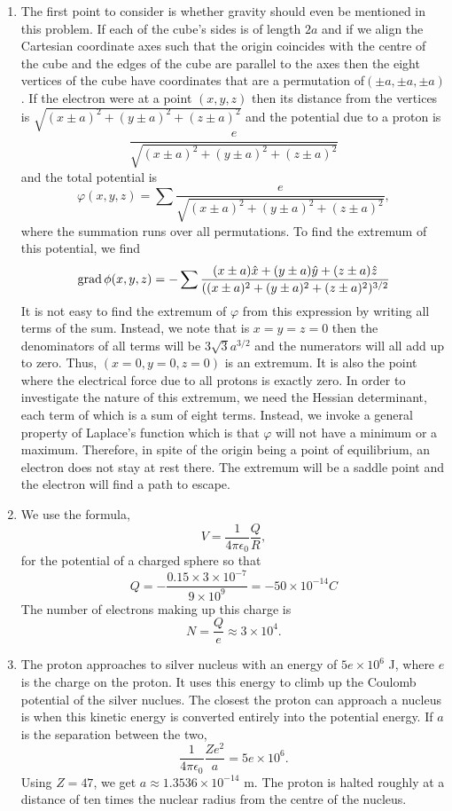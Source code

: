 \documentclass{article}
\begin{document}
\begin{enumerate}
\item The first point to consider is whether gravity should even be mentioned in
this problem. If each of the cube's sides is of length $2a$ and if we align the
Cartesian coordinate axes such that the origin coincides with the centre of the
cube and the edges of the cube are parallel to the axes then the eight vertices
of the cube have coordinates that are a permutation of$(\pm a, \pm a, \pm a)$.
If the electron were at a point $(x, y, z)$ then its distance from the vertices
is $\sqrt{(x \pm a)^2 + (y \pm a)^2 + (z \pm a)^2}$ and the potential due to a
proton is
\[
\frac{e}{\sqrt{(x \pm a)^2 + (y \pm a)^2 + (z \pm a)^2}}
\]
and the total potential is
\[
\varphi(x, y, z) = \sum \frac{e}{\sqrt{(x \pm a)^2 + (y \pm a)^2 + (z \pm a)^2}},
\]
where the summation runs over all permutations. To find the extremum of this
potential, we find
\[
\operatorname{grad}\phi(x,y,z) = -\sum\frac{(x \pm a)\hat{x}+(y \pm a)\hat{y}+(z \pm a)\hat{z}}
{((x \pm a)^2 + (y \pm a)^2 + (z \pm a)^2)^{3/2}}
\]
It is not easy to find the extremum of $\varphi$ from this expression by writing
all terms of the sum. Instead, we note that is $x = y = z = 0$ then the denominators
of all terms will be $3\sqrt{3}a^{3/2}$ and the numerators will all add up to zero.
Thus, $(x = 0, y = 0, z = 0)$ is an extremum. It is also the point where the 
electrical force due to all protons is exactly zero. In order to investigate the
nature of this extremum, we need the Hessian determinant, each term of which is
a sum of eight terms. Instead, we invoke a general property of Laplace's function
which is that $\varphi$ will not have a minimum or a maximum. Therefore, in spite
of the origin being a point of equilibrium, an electron does not stay at rest there.
The extremum will be a saddle point and the electron will find a path to escape.

\item We use the formula,
\[
V = \frac{1}{4\pi\epsilon_0}\frac{Q}{R},
\] for the potential of a charged sphere so that
\[
Q = -\frac{0.15 \times 3 \times 10^{-7}}{9 \times 10^9} = -50 \times 10^{-14}C
\]
The number of electrons making up this charge is
\[
N = \frac{Q}{e} \approx 3 \times 10^4.
\]

\item The proton approaches to silver nucleus with an energy of $5e\times 10^6$ J,
where $e$ is the charge on the proton. It uses this energy to climb up the 
Coulomb potential of the silver nuclues. The closest the proton can approach a
nucleus is when this kinetic energy is converted entirely into the potential 
energy. If $a$ is the separation between the two,
\[
\frac{1}{4\pi\epsilon_0}\frac{Ze^2}{a} = 5e \times 10^6.
\]
Using $Z = 47$, we get $a \approx 1.3536 \times 10^{-14}$ m. The proton is halted
roughly at a distance of ten times the nuclear radius from the centre of the
nucleus.


\end{enumerate}
\end{document}
